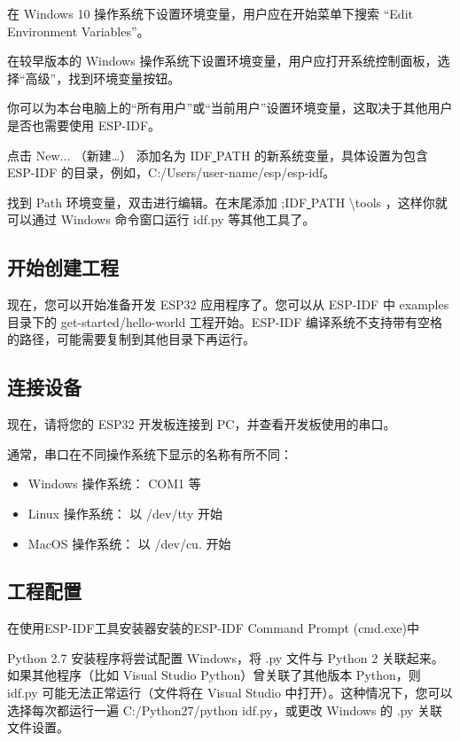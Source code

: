 在 Windows 10 操作系统下设置环境变量，用户应在开始菜单下搜索 “Edit Environment Variables”。

在较早版本的 Windows 操作系统下设置环境变量，用户应打开系统控制面板，选择“高级”，找到环境变量按钮。

你可以为本台电脑上的“所有用户”或“当前用户”设置环境变量，这取决于其他用户是否也需要使用 ESP-IDF。

点击 New... （新建…） 添加名为 IDF\underline{ }PATH 的新系统变量，具体设置为包含 ESP-IDF 的目录，例如，C:/Users/user-name/esp/esp-idf。

找到 Path 环境变量，双击进行编辑。在末尾添加 ;IDF\underline{ }PATH \backslash tools ，这样你就可以通过 Windows 命令窗口运行 idf.py 等其他工具了。

\subsection{开始创建工程}

现在，您可以开始准备开发 ESP32 应用程序了。您可以从 ESP-IDF 中 examples 目录下的 get-started/hello-world 工程开始。ESP-IDF 编译系统不支持带有空格的路径，可能需要复制到其他目录下再运行。

\subsection{连接设备}

现在，请将您的 ESP32 开发板连接到 PC，并查看开发板使用的串口。

通常，串口在不同操作系统下显示的名称有所不同：

\begin{itemize}
    \item Windows 操作系统： COM1 等
    \item Linux 操作系统： 以 /dev/tty 开始
    \item MacOS 操作系统： 以 /dev/cu. 开始
\end{itemize}


\subsection{工程配置}

在使用ESP-IDF工具安装器安装的ESP-IDF Command Prompt (cmd.exe)中

Python 2.7 安装程序将尝试配置 Windows，将 .py 文件与 Python 2 关联起来。如果其他程序（比如 Visual Studio Python）曾关联了其他版本 Python，则 idf.py 可能无法正常运行（文件将在 Visual Studio 中打开）。这种情况下，您可以选择每次都运行一遍 C:/Python27/python idf.py，或更改 Windows 的 .py 关联文件设置。


